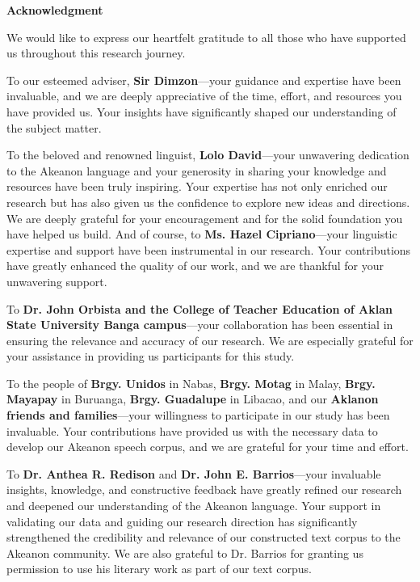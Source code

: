 \begin{center}
	\textbf{Acknowledgment}
\end{center}

We would like to express our heartfelt gratitude to all those who have supported us throughout this research journey.

To our esteemed adviser, \textbf{Sir Dimzon}---your guidance and expertise have been invaluable, and we are deeply appreciative of the time, effort, and resources you have provided us. Your insights have significantly shaped our understanding of the subject matter.

To the beloved and renowned linguist, \textbf{Lolo David}---your unwavering dedication to the Akeanon language and your generosity in sharing your knowledge and resources have been truly inspiring. Your expertise has not only enriched our research but has also given us the confidence to explore new ideas and directions. We are deeply grateful for your encouragement and for the solid foundation you have helped us build. And of course, to \textbf{Ms. Hazel Cipriano}---your linguistic expertise and support have been instrumental in our research. Your contributions have greatly enhanced the quality of our work, and we are thankful for your unwavering support.

To \textbf{Dr. John Orbista and the College of Teacher Education of Aklan State University Banga campus}---your collaboration has been essential in ensuring the relevance and accuracy of our research. We are especially grateful for your assistance in providing us participants for this study.

To the people of \textbf{Brgy. Unidos} in Nabas, \textbf{Brgy. Motag} in Malay, \textbf{Brgy. Mayapay} in Buruanga, \textbf{Brgy. Guadalupe} in Libacao, and our \textbf{Aklanon friends and families}---your willingness to participate in our study has been invaluable. Your contributions have provided us with the necessary data to develop our Akeanon speech corpus, and we are grateful for your time and effort.

To \textbf{Dr. Anthea R. Redison} and \textbf{Dr. John E. Barrios}---your invaluable insights, knowledge, and constructive feedback have greatly refined our research and deepened our understanding of the Akeanon language. Your support in validating our data and guiding our research direction has significantly strengthened the credibility and relevance of our constructed text corpus to the Akeanon community. We are also grateful to Dr. Barrios for granting us permission to use his literary work as part of our text corpus.

